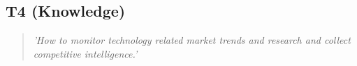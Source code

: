 \subsection{T4 (Knowledge)}

  \begin{quote}
    \textit{'How to monitor technology related
    market trends and research and collect competitive
    intelligence.'}
  \end{quote}

\newpage
